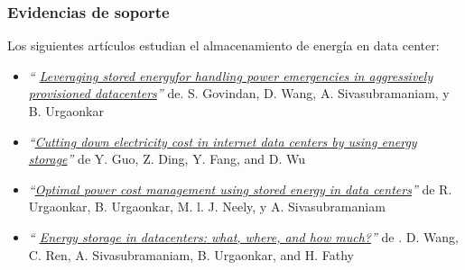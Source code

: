\documentclass[11pt]{beamer}					%
\begin{document}
\begin{frame}[fragile]						%
	\frametitle{Evidencias de soporte}					
	\begin{center}
		Los siguientes artículos estudian el almacenamiento de energía en data center:
		
		\begin{itemize}
			
				
		\item \textit{“	\href{http://www.cse.psu.edu/~buu1/papers/ps/asplos12.pdf}{Leveraging stored energyfor handling power emergencies in aggressively provisioned datacenters}”} de. S. Govindan, D. Wang, A. Sivasubramaniam, y B. Urgaonkar
			
		
			
	\item \textit{“\href{http://www.fang.ece.ufl.edu/mypaper/globecom11guoy.pdf}{Cutting down electricity cost in internet data centers by using energy storage}”}  de Y. Guo, Z. Ding, Y. Fang, and D. Wu
			
			
	\item \textit{“\href{http://www.cse.psu.edu/~buu1/papers/ps/sigmetrics11.pdf}{Optimal power cost management using stored energy in data centers}”} de R. Urgaonkar, B. Urgaonkar, M. l. J. Neely, y A. Sivasubramaniam

\item \textit{“	\href{http://www.cse.psu.edu/~buu1/papers/ps/sigmetrics12.pdf}{Energy storage in datacenters: what, where, and how much?}”} de  . D. Wang, C. Ren, A. Sivasubramaniam, B. Urgaonkar, and H. Fathy
		\end{itemize}
		
	\end{center}
\end{frame}
\end{document}
